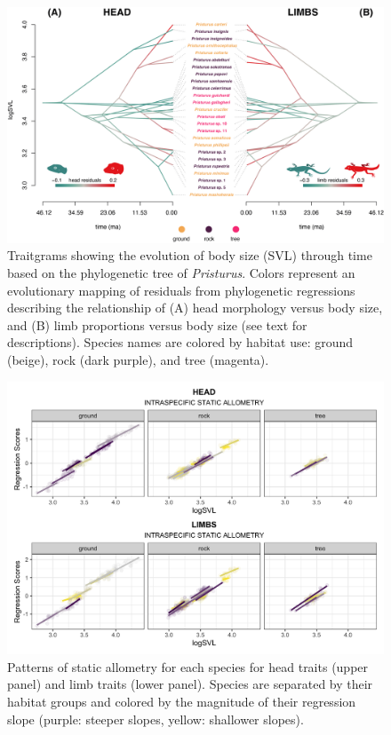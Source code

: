 \documentclass[
  11pt,
]{article}
\begin{document}
\begin{figure}

{\centering \includegraphics[width=1\linewidth]{Figs/figure_3_Pristurus_allometry_traitgram_legends} 

}

\caption{Traitgrams showing the evolution of body size (SVL) through time based on the phylogenetic tree of \textit{Pristurus}. Colors represent an evolutionary mapping of residuals from phylogenetic regressions describing the relationship of (A) head morphology versus body size, and (B) limb proportions versus body size (see text for descriptions). Species names are colored by habitat use: ground (beige), rock (dark purple), and tree (magenta).}\label{fig:unnamed-chunk-6}
\end{figure}

\newpage

\begin{figure}

{\centering \includegraphics[width=1\linewidth]{Figs/figure_4_static_allometry_v2} 

}

\caption{Patterns of static allometry for each species for head traits (upper panel) and limb traits (lower panel). Species are separated by their habitat groups and colored by the magnitude of their regression slope (purple: steeper slopes, yellow: shallower slopes).}\label{fig:unnamed-chunk-7}
\end{figure}
\end{document}
